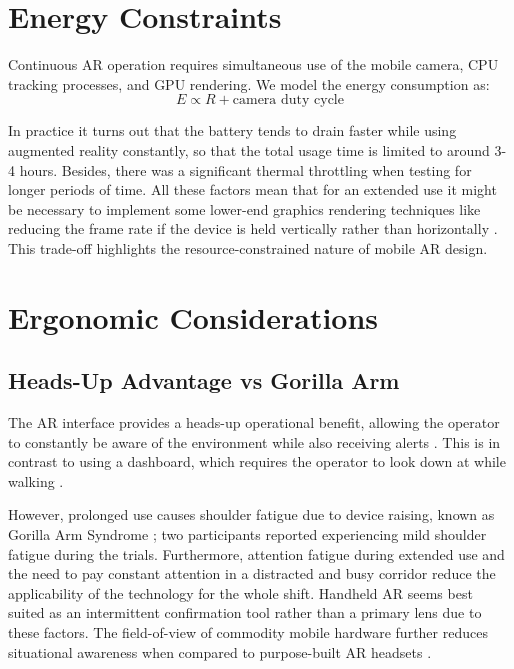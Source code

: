 \documentclass[conference]{IEEEtran}
\begin{document}
\section{Energy Constraints}

Continuous AR operation requires simultaneous use of the mobile camera, CPU tracking processes, and GPU rendering. We model the energy consumption as:
\begin{equation}
E \propto R + \text{camera duty cycle}
\end{equation}

In practice it turns out that the battery tends to drain faster while using augmented reality constantly, so that the total usage time is limited to around 3-4 hours. Besides, there was a significant thermal throttling when testing for longer periods of time. All these factors mean that for an extended use it might be necessary to implement some lower-end graphics rendering techniques like reducing the frame rate if the device is held vertically rather than horizontally \cite{b33}. This trade-off highlights the resource-constrained nature of mobile AR design.

\section{Ergonomic Considerations}

\subsection{Heads-Up Advantage vs Gorilla Arm}
The AR interface provides a heads-up operational benefit, allowing the operator to constantly be aware of the environment while also receiving alerts \cite{b25}. This is in contrast to using a dashboard, which requires the operator to look down at while walking \cite{b29}.

However, prolonged use causes shoulder fatigue due to device raising, known as Gorilla Arm Syndrome \cite{b22}; two participants reported experiencing mild shoulder fatigue during the trials. Furthermore, attention fatigue during extended use and the need to pay constant attention in a distracted and busy corridor reduce the applicability of the technology for the whole shift. Handheld AR seems best suited as an intermittent confirmation tool rather than a primary lens due to these factors. The field-of-view of commodity mobile hardware further reduces situational awareness when compared to purpose-built AR headsets \cite{b10}.
\end{document}
